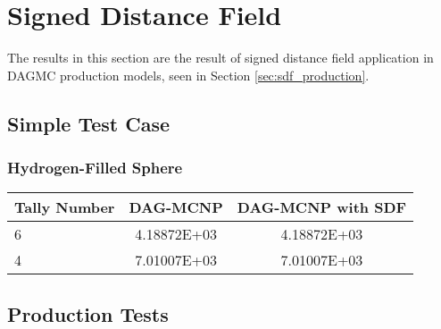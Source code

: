   
  \section{Signed Distance Field}

  The results in this section are the result of signed distance field
  application in DAGMC production models, seen in Section
  \ref{sec:sdf_production}.
  
  \subsection{Simple Test Case}
  
  \subsubsection{Hydrogen-Filled Sphere}

  \begin{table}[H]
    \small
    \begin{center}
      \begin{tabular}{lcc}
        \toprule
        Tally Number & DAG-MCNP & DAG-MCNP with SDF \\
        \toprule
        6            & 4.18872E+03 & 4.18872E+03 \\
        4            &  7.01007E+03 &  7.01007E+03 \\
        \bottomrule
        \end{tabular}
    \end{center}
  \end{table}
  
  \subsection{Production Tests}
  
